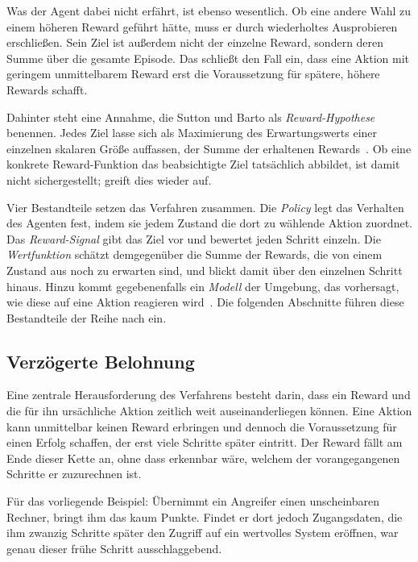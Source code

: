 Was der Agent dabei nicht erfährt, ist ebenso wesentlich. Ob eine andere Wahl zu einem höheren Reward
geführt hätte, muss er durch wiederholtes Ausprobieren erschließen.
Sein Ziel ist außerdem nicht der einzelne Reward, sondern deren Summe über die
gesamte Episode. Das schließt den Fall ein, dass eine Aktion mit geringem unmittelbarem
Reward erst die Voraussetzung für spätere, höhere Rewards schafft.

Dahinter steht eine Annahme, die Sutton und Barto als \emph{Reward-Hypothese}
benennen. Jedes Ziel lasse sich als Maximierung des Erwartungswerts einer
einzelnen skalaren Größe auffassen, der Summe der erhaltenen
Rewards~\cite[Abschn.~3.2]{suttonbarto2018}. Ob eine konkrete
Reward-Funktion das beabsichtigte Ziel tatsächlich abbildet, ist damit
nicht sichergestellt;  greift dies wieder auf.

Vier Bestandteile setzen das Verfahren zusammen. Die \emph{Policy} legt das Verhalten des
Agenten fest, indem sie jedem Zustand die dort zu wählende Aktion zuordnet. Das
\emph{Reward-Signal} gibt das Ziel vor und bewertet jeden Schritt einzeln. Die
\emph{Wertfunktion} schätzt demgegenüber die Summe der Rewards, die von
einem Zustand aus noch zu erwarten sind, und blickt damit über den
einzelnen Schritt hinaus.
Hinzu kommt gegebenenfalls ein \emph{Modell} der Umgebung, das vorhersagt, wie
diese auf eine Aktion reagieren
wird~\cite[Abschn.~1.3]{suttonbarto2018}. Die folgenden Abschnitte führen diese
Bestandteile der Reihe nach ein.

\subsection{Verzögerte Belohnung}
\label{sec:credit}

Eine zentrale Herausforderung des Verfahrens besteht darin, dass ein Reward und
die für ihn ursächliche Aktion zeitlich weit auseinanderliegen können. Eine
Aktion kann unmittelbar keinen Reward erbringen und dennoch die Voraussetzung
für einen Erfolg schaffen, der erst viele Schritte später eintritt. Der Reward
fällt am Ende dieser Kette an, ohne dass erkennbar wäre, welchem der
vorangegangenen Schritte er zuzurechnen ist.

Für das vorliegende Beispiel: Übernimmt ein Angreifer einen unscheinbaren
Rechner, bringt ihm das kaum Punkte. Findet er dort jedoch Zugangsdaten, die ihm
zwanzig Schritte später den Zugriff auf ein wertvolles System eröffnen, war
genau dieser frühe Schritt ausschlaggebend.

